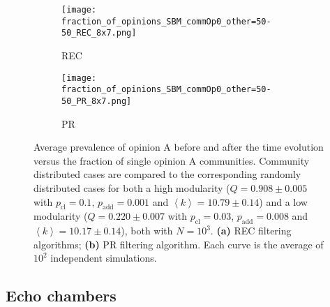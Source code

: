 \documentclass[11 pt , letterpaper , twoside , openright]{book}
\begin{document}
\begin{figure}[H]
  \begin{subfigure}[b]{0.49\textwidth}
    \caption{REC}
  	\texttt{[image: fraction\_of\_opinions\_SBM\_commOp0\_other=50-50\_REC\_8x7.png]}
    \label{rec_comm}
  \end{subfigure}
  \begin{subfigure}[b]{0.49\textwidth}
    \caption{PR}
  	\texttt{[image: fraction\_of\_opinions\_SBM\_commOp0\_other=50-50\_PR\_8x7.png]}
    \label{pr_comm}
  \end{subfigure}
  \captionsetup{format=plain}
  \caption[Average prevalence of opinion A before and after the time evolution versus the fraction of single opinion A communities. Community distributed cases are compared to the corresponding randomly distributed cases for both a high modularity and a low modularity network. Results for the REC and PR filtering algorithms.]{Average prevalence of opinion A before and after the time evolution versus the fraction of single opinion A communities. Community distributed cases are compared to the corresponding randomly distributed cases for both a high modularity ($Q = 0.908 \pm 0.005$ with $p_{\text{cl}} = 0.1$, $p_{\text{add}} = 0.001$ and $\left<k\right> = 10.79 \pm 0.14$) and a low modularity ($Q = 0.220 \pm 0.007$ with $p_{\text{cl}} = 0.03$, $p_{\text{add}} = 0.008$ and $\left<k\right> = 10.17 \pm 0.14$), both with $N=10^3$. \textbf{(a)} REC filtering algorithms; \textbf{(b)} PR filtering algorithm. Each curve is the average of $10^2$ independent simulations.}
\label{fracOp0_vs_commOp0_other_50-50}
\end{figure}

\subsection{Echo chambers}\label{groupVSrandomECHO}
\end{document}
